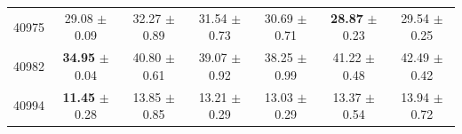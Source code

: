 \begin{table}[t]
\begin{tabular*}{\textwidth}{@{\extracolsep{\fill}}rcccccc@{}}
40975 & 29.08 $\pm$ 0.09 & 32.27 $\pm$ 0.89 & 31.54 $\pm$ 0.73 & 30.69 $\pm$ 0.71 & \textbf{28.87} $\pm$ 0.23 & 29.54 $\pm$ 0.25 \\
40982 & \textbf{34.95} $\pm$ 0.04 & 40.80 $\pm$ 0.61 & 39.07 $\pm$ 0.92 & 38.25 $\pm$ 0.99 & 41.22 $\pm$ 0.48 & 42.49 $\pm$ 0.42 \\
40994 & \textbf{11.45} $\pm$ 0.28 & 13.85 $\pm$ 0.85 & 13.21 $\pm$ 0.29 & 13.03 $\pm$ 0.29 & 13.37 $\pm$ 0.54 & 13.94 $\pm$ 0.72 \\
\bottomrule
\end{tabular*}
\end{table}
